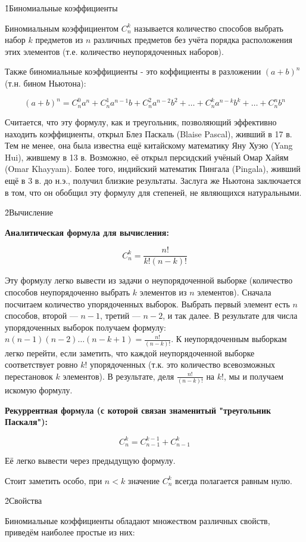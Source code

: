 \h1{Биномиальные коэффициенты}

Биномиальным коэффициентом $C_n^k$ называется количество способов выбрать набор $k$ предметов из $n$ различных предметов без учёта порядка расположения этих элементов (т.е. количество неупорядоченных наборов).

Также биномиальные коэффициенты - это коффициенты в разложении $(a+b)^n$ (т.н. бином Ньютона):

$$ (a+b)^n = C_n^0 a^n + C_n^1 a^{n-1} b + C_n^2 a^{n-2} b^2 + \ldots + C_n^k a^{n-k} b^k + \ldots + C_n^n b^n $$

Считается, что эту формулу, как и треугольник, позволяющий эффективно находить коэффициенты, открыл Блез Паскаль (Blaise Pascal), живший в 17 в. Тем не менее, она была известна ещё китайскому математику Яну Хуэю (Yang Hui), жившему в 13 в. Возможно, её открыл персидский учёный Омар Хайям (Omar Khayyam). Более того, индийский математик Пингала (Pingala), живший ещё в 3 в. до н.э., получил близкие результаты. Заслуга же Ньютона заключается в том, что он обобщил эту формулу для степеней, не являющихся натуральными.

\h2{Вычисление}

\bf{Аналитическая формула} для вычисления:

$$ C_n^k = \frac{n!}{k! (n-k)!} $$

Эту формулу легко вывести из задачи о неупорядоченной выборке (количество способов неупорядоченно выбрать $k$ элементов из $n$ элементов). Сначала посчитаем количество упорядоченных выборок. Выбрать первый элемент есть $n$ способов, второй --- $n-1$, третий --- $n-2$, и так далее. В результате для числа упорядоченных выборок получаем формулу: $ n (n-1) (n-2) \ldots (n-k+1) = \frac{n!}{(n-k)!} $. К неупорядоченным выборкам легко перейти, если заметить, что каждой неупорядоченной выборке соответствует ровно $k!$ упорядоченных (т.к. это количество всевозможных перестановок $k$ элементов). В результате, деля $\frac{n!}{(n-k)!}$ на $k!$, мы и получаем искомую формулу.

\bf{Рекуррентная формула} (с которой связан знаменитый "треугольник Паскаля"):

$$ C_n^k = C_{n-1}^{k-1} + C_{n-1}^k $$

Её легко вывести через предыдущую формулу.

Стоит заметить особо, при $n<k$ значение $C_n^k$ всегда полагается равным нулю.

\h2{Свойства}

Биномиальные коэффициенты обладают множеством различных свойств, приведём наиболее простые из них:

